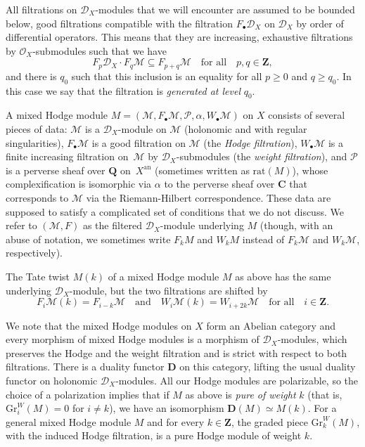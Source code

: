 \documentclass[11pt]{article}
\numberwithin{equation}{section}
\newcommand{\sbullet}{{\scriptscriptstyle\bullet}}
\newcommand{\DXmodule}{$\cD_X$\nobreakdash-mod\-ule\xspace}
\newcommand{\DXmodules}{$\cD_X$\nobreakdash-mod\-ules\xspace}
\theoremstyle{plain}
\theoremstyle{definition}
\newcommand\Z{{\mathbf Z}}
\newcommand\Q{{\mathbf Q}}
\newcommand\C{{\mathbf C}}
\newcommand\cD{\mathcal{D}}
\newcommand\cO{\mathcal{O}}
\newcommand\cM{\mathcal{M}}
\newcommand\cP{\mathcal{P}}
\newcommand\cO{\mathcal{O}}
\newcommand\gr{\mathrm{Gr}}
\begin{document}
All filtrations on \DXmodules that we will encounter are assumed to be bounded below, good filtrations compatible with the
filtration $F_{\sbullet}\cD_X$ on $\cD_X$ by order of differential operators. This means that they are increasing, exhaustive filtrations by $\cO_X$-submodules such that we have
\[F_p\cD_X\cdot F_q\cM\subseteq F_{p+q}\cM\quad\text{for all}\quad p,q\in\Z,\]
and there is $q_0$ such that this inclusion is an equality for all $p\geq 0$ and $q\geq q_0$. In this case we say that the filtration is \emph{generated at level} $q_0$.

A mixed Hodge module $M=(\cM, F_{\sbullet}\cM, {\mathcal P}, \alpha, W_{\sbullet}\cM)$ on $X$ consists of several pieces of data: $\cM$ is a \DXmodule on $\cM$ (holonomic and with regular singularities), $F_{\sbullet}\cM$ is a good filtration on $\cM$ (the \emph{Hodge filtration}), $W_{\sbullet}\cM$ is a finite increasing
filtration on~$\cM$ by $\cD_X$-submodules (the \emph{weight filtration}), and $\cP$
is a perverse sheaf over $\Q$ on~$X^\mathrm{an}$ (sometimes written as $\mathrm{rat}(M)$), whose complexification is isomorphic via $\alpha$ to the perverse sheaf over $\C$ that corresponds to $\cM$ via the
Riemann-Hilbert correspondence. These data are supposed to satisfy a complicated set of conditions that we do not discuss.
We refer to $(\cM,F)$ as the filtered \DXmodule underlying $M$ (though,
with an abuse of notation, we sometimes write $F_kM$ and $W_kM$ instead of $F_k\cM$ and $W_k\cM$, respectively).

The Tate twist $M(k)$ of a mixed Hodge module $M$ as above has the same underlying \DXmodule, but the two filtrations are shifted by
\[F_i\cM(k)=F_{i-k}\cM\quad\text{and}\quad W_i\cM(k)=W_{i+2k}\cM\quad\text{for all}\quad i\in\Z.\]

We note that the mixed Hodge modules on $X$ form an Abelian category and every morphism of mixed Hodge modules is a morphism of \DXmodules, which
preserves the Hodge and the weight filtration and is strict with respect to both filtrations.
There is a duality functor ${\mathbf D}$ on this category, lifting the usual duality functor on holonomic \DXmodules. All our Hodge
modules are polarizable, so the choice of a polarization implies that if $M$ as above is \emph{pure of weight} $k$ (that is, $\gr^W_i(M)=0$ for $i\neq k$), we have an isomorphism
${\mathbf D}(M)\simeq M(k)$. For a general mixed Hodge module $M$ and for every $k\in\Z$, the graded piece $\gr_k^W(M)$, with the induced Hodge filtration, is a pure
Hodge module of weight $k$.
\end{document}
